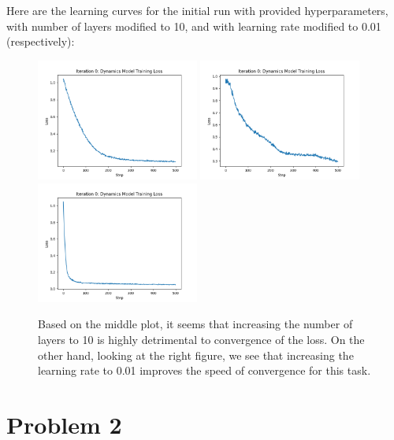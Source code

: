 \documentclass{article} %
\begin{document}
\begin{sol}
  Here are the learning curves for the initial run with provided hyperparameters, with number of layers modified to 10, and with learning rate modified to 0.01 (respectively):
  \begin{figure}[!ht]
    \begin{center}
    \includegraphics[width=2.1in]{images/q1/itr_0_loss_curve.png}
    \includegraphics[width=2.1in]{images/q1/itr_0_loss_curve_layer10.png}
    \includegraphics[width=2.1in]{images/q1/itr_0_loss_curve_lr0.01.png}
  \end{center}
  \caption{Based on the middle plot, it seems that increasing the number of layers to 10 is highly detrimental to convergence of the loss. On the other hand, looking at the right figure, we see that increasing the learning rate to 0.01 improves the speed of convergence for this task.}
  \end{figure}
\end{sol}

\newpage
\section*{Problem 2}
\end{document}
